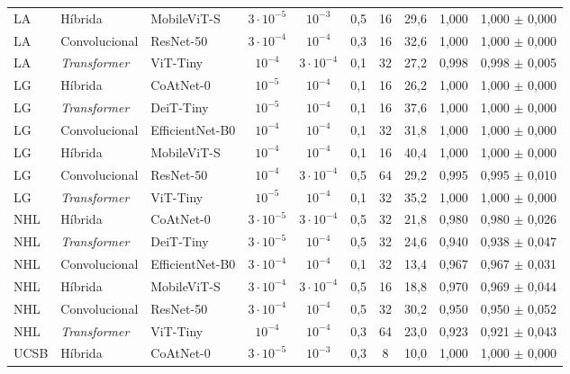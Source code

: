 \begin{table}[H]
{\begin{tabular}{lllccccccc}
LA & Híbrida & MobileViT-S & $3 \cdot 10^{-5}$ & $10^{-3}$ & 0{,}5 & 16 & 29{,}6 & 1{,}000 & 1{,}000 $\pm$ 0{,}000 \\
LA & Convolucional & ResNet-50 & $3 \cdot 10^{-4}$ & $10^{-4}$ & 0{,}3 & 16 & 32{,}6 & 1{,}000 & 1{,}000 $\pm$ 0{,}000 \\
LA & \textit{Transformer} & ViT-Tiny & $10^{-4}$ & $3 \cdot 10^{-4}$ & 0{,}1 & 32 & 27{,}2 & 0{,}998 & 0{,}998 $\pm$ 0{,}005 \\
\midrule
LG & Híbrida & CoAtNet-0 & $10^{-5}$ & $10^{-4}$ & 0{,}1 & 16 & 26{,}2 & 1{,}000 & 1{,}000 $\pm$ 0{,}000 \\
LG & \textit{Transformer} & DeiT-Tiny & $10^{-5}$ & $10^{-4}$ & 0{,}1 & 16 & 37{,}6 & 1{,}000 & 1{,}000 $\pm$ 0{,}000 \\
LG & Convolucional & EfficientNet-B0 & $10^{-4}$ & $10^{-4}$ & 0{,}1 & 32 & 31{,}8 & 1{,}000 & 1{,}000 $\pm$ 0{,}000 \\
LG & Híbrida & MobileViT-S & $10^{-4}$ & $10^{-4}$ & 0{,}1 & 16 & 40{,}4 & 1{,}000 & 1{,}000 $\pm$ 0{,}000 \\
LG & Convolucional & ResNet-50 & $10^{-4}$ & $3 \cdot 10^{-4}$ & 0{,}5 & 64 & 29{,}2 & 0{,}995 & 0{,}995 $\pm$ 0{,}010 \\
LG & \textit{Transformer} & ViT-Tiny & $10^{-5}$ & $10^{-4}$ & 0{,}1 & 32 & 35{,}2 & 1{,}000 & 1{,}000 $\pm$ 0{,}000 \\
\midrule
NHL & Híbrida & CoAtNet-0 & $3 \cdot 10^{-5}$ & $3 \cdot 10^{-4}$ & 0{,}5 & 32 & 21{,}8 & 0{,}980 & 0{,}980 $\pm$ 0{,}026 \\
NHL & \textit{Transformer} & DeiT-Tiny & $3 \cdot 10^{-5}$ & $10^{-4}$ & 0{,}5 & 32 & 24{,}6 & 0{,}940 & 0{,}938 $\pm$ 0{,}047 \\
NHL & Convolucional & EfficientNet-B0 & $3 \cdot 10^{-4}$ & $10^{-4}$ & 0{,}1 & 32 & 13{,}4 & 0{,}967 & 0{,}967 $\pm$ 0{,}031 \\
NHL & Híbrida & MobileViT-S & $3 \cdot 10^{-4}$ & $3 \cdot 10^{-4}$ & 0{,}5 & 16 & 18{,}8 & 0{,}970 & 0{,}969 $\pm$ 0{,}044 \\
NHL & Convolucional & ResNet-50 & $3 \cdot 10^{-4}$ & $10^{-4}$ & 0{,}5 & 32 & 30{,}2 & 0{,}950 & 0{,}950 $\pm$ 0{,}052 \\
NHL & \textit{Transformer} & ViT-Tiny & $10^{-4}$ & $10^{-4}$ & 0{,}3 & 64 & 23{,}0 & 0{,}923 & 0{,}921 $\pm$ 0{,}043 \\
\midrule
UCSB & Híbrida & CoAtNet-0 & $3 \cdot 10^{-5}$ & $10^{-3}$ & 0{,}3 & 8 & 10{,}0 & 1{,}000 & 1{,}000 $\pm$ 0{,}000 \\

\end{tabular}}
\end{table}
